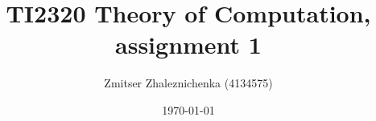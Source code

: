 \documentclass[a4paper, notitlepage]{article}
\begin{document}
\title{TI2320 Theory of Computation, assignment 1} 
\author{Zmitser Zhaleznichenka (4134575)}
\date{\today}
\maketitle

\setcounter{secnumdepth}{0}
\end{document}
